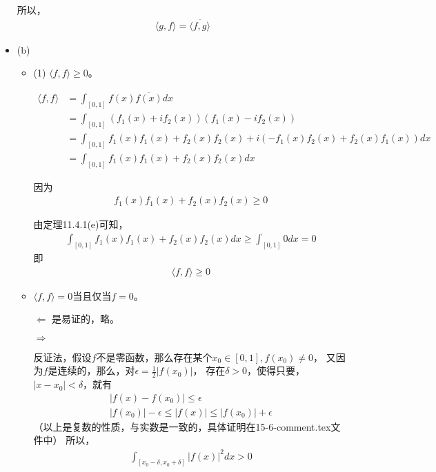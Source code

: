 \documentclass{article}
\begin{document}
\begin{itemize}
        所以，
        \begin{align*}
          \langle g, f \rangle = \overline{\langle f, g \rangle}
        \end{align*}

  \item (b)

        \begin{itemize}
          \item (1) $\langle f, f \rangle \geq 0$。

                \begin{align*}
                  \langle f, f \rangle & = \int_{[0, 1]} f(x) \overline{f(x)} dx                                         \\
                                       & = \int_{[0, 1]} (f_1(x) + if_2(x))(f_1(x) - if_2(x))                            \\
                                       & = \int_{[0, 1]} f_1(x)f_1(x) + f_2(x)f_2(x) + i(-f_1(x)f_2(x) + f_2(x)f_1(x))dx \\
                                       & = \int_{[0, 1]} f_1(x)f_1(x) + f_2(x)f_2(x)dx
                \end{align*}

                因为
                \begin{align*}
                  f_1(x)f_1(x) + f_2(x)f_2(x) \geq 0
                \end{align*}

                由定理11.4.1(e)可知，
                \begin{align*}
                  \int_{[0, 1]} f_1(x)f_1(x) + f_2(x)f_2(x)dx \geq \int_{[0, 1]} 0 dx = 0
                \end{align*}
                即
                \begin{align*}
                  \langle f, f \rangle \geq 0
                \end{align*}

          \item $\langle f, f \rangle = 0$当且仅当$f = 0$。

                $\Leftarrow$ 是易证的，略。

                $\Rightarrow$

                反证法，假设$f$不是零函数，那么存在某个$x_0 \in [0, 1], f(x_0) \neq 0$，
                又因为$f$是连续的，那么，对$\epsilon = \frac{1}{2}|f(x_0)|$，
                存在$\delta > 0$，使得只要，$|x - x_0| < \delta$，就有
                \begin{align*}
                  |f(x) - f(x_0)| \leq \epsilon \\
                  |f(x_0)| - \epsilon \leq |f(x)| \leq |f(x_0)| + \epsilon
                \end{align*}
                （以上是复数的性质，与实数是一致的，具体证明在15-6-comment.tex文件中）
                所以，
                \begin{align*}
                  \int_{[x_0 - \delta, x_0 + \delta]} |f(x)|^2 dx > 0
                \end{align*}


\end{itemize}
\end{itemize}
\end{document}

